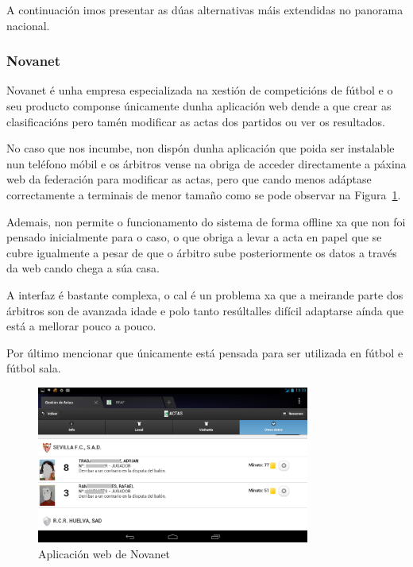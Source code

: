     A continuación imos presentar as dúas alternativas máis extendidas no 
panorama nacional.

      \subsubsection{Novanet}
      Novanet é unha empresa especializada na xestión de competicións de fútbol 
e o seu producto componse únicamente dunha aplicación web dende a que crear as 
clasificacións pero tamén modificar as actas dos partidos ou ver os resultados.

      No caso que nos incumbe, non dispón dunha aplicación que poida ser instalable nun 
teléfono móbil e os árbitros vense na obriga de acceder directamente a páxina web da 
federación para modificar as actas, pero que cando menos adáptase correctamente 
a terminais de menor tamaño como se pode observar na 
Figura~\ref{fig:img:novanet}.

      Ademais, non permite o funcionamento do sistema de forma offline xa que 
non foi pensado inicialmente para o caso, o que obriga a levar a acta en papel 
que se cubre igualmente a pesar de que o árbitro sube posteriormente os datos a 
través da web cando chega a súa casa.

      A interfaz é bastante complexa, o cal é un problema xa que a meirande parte dos 
árbitros son de avanzada idade e polo tanto resúltalles difícil adaptarse 
aínda que está a mellorar pouco a pouco.

      Por último mencionar que únicamente está pensada para ser utilizada en 
fútbol e fútbol sala.
	
      \begin{figure}[h!]
	\begin{center}
	  \includegraphics[width=0.8\textwidth]{./img/novanet-app.png}
	  \caption{Aplicación web de Novanet}
	  \label{fig:img:novanet}
	\end{center}
      \end{figure}

